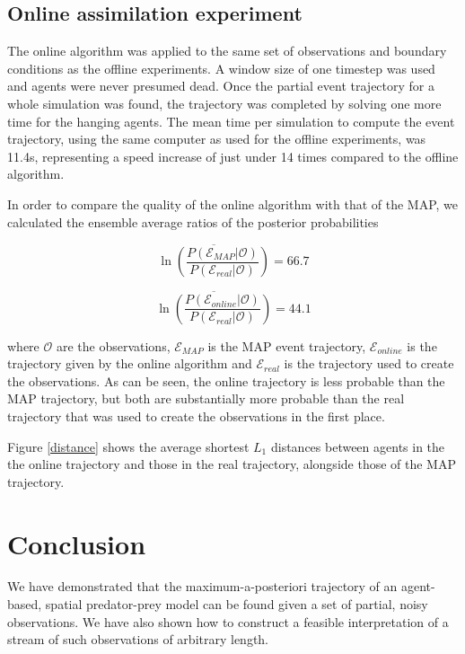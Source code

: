 \documentclass{article}
\begin{document}
\subsection{Online assimilation experiment}

The online algorithm was applied to the same set of observations and boundary conditions as the offline experiments. A window size of one timestep was used and agents were never presumed dead. Once the partial event trajectory for a whole simulation was found, the trajectory was completed by solving one more time for the hanging agents. The mean time per simulation to compute the event trajectory, using the same computer as used for the offline experiments, was 11.4s, representing a speed increase of just under 14 times compared to the offline algorithm.

In order to compare the quality of the online algorithm with that of the MAP, we calculated the ensemble average ratios of the posterior probabilities

\[
\overline{\ln\left(\frac{P(\mathcal{E}_{MAP}|\mathcal{O})}{P(\mathcal{E}_{real}|\mathcal{O})}\right)} = 66.7
\]

\[
\overline{\ln\left(\frac{P(\mathcal{E}_{online}|\mathcal{O})}{P(\mathcal{E}_{real}|\mathcal{O})}\right)} = 44.1
\]

where $\mathcal{O}$ are the observations, $\mathcal{E}_{MAP}$ is the MAP event trajectory, $\mathcal{E}_{online}$ is the trajectory given by the online algorithm and $\mathcal{E}_{real}$ is the trajectory used to create the observations. As can be seen, the online trajectory is less probable than the MAP trajectory, but both are substantially more probable than the real trajectory that was used to create the observations in the first place.

Figure \ref{distance} shows the average shortest $L_1$ distances between agents in the the online trajectory and those in the real trajectory, alongside those of the MAP trajectory.

\section{Conclusion}

We have demonstrated that the maximum-a-posteriori trajectory of an agent-based, spatial predator-prey model can be found given a set of partial, noisy observations. We have also shown how to construct a feasible interpretation of a stream of such observations of arbitrary length.
\end{document}
